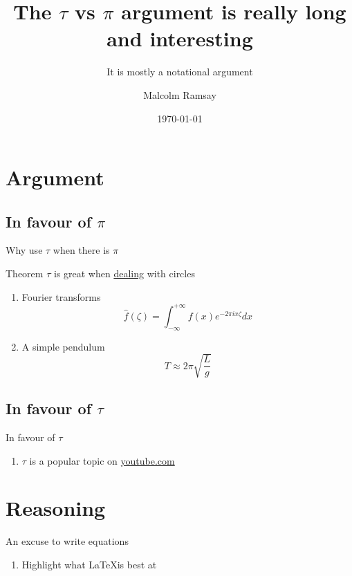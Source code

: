 \documentclass[aspectratio=169, 22pt]{beamer}
\title{The $\tau$ vs $\pi$ argument is really long and interesting}
\subtitle{It is mostly a notational argument}
\date{\today}
\author[Malcolm]{Malcolm Ramsay}
\begin{document}
\begin{frame}
  \titlepage{}
\end{frame}

\section{Argument}
\subsection{In favour of $\pi$}

\begin{frame}{Why use $\tau$ when there is $\pi$}
  \begin{block}{Theorem}
    $\tau$ is great when \href{http://blah}{dealing} with circles
  \end{block}

  \begin{enumerate}
    \item<1-> Fourier transforms
      \begin{equation}
        \hat f(\zeta) = \int_{-\infty}^{+\infty} f(x) e^{-2\pi ix\zeta} dx
      \end{equation}
    \item<2-> A simple pendulum
      \begin{equation}
        T \approx 2\pi \sqrt{\frac{L}{g}}
      \end{equation}
  \end{enumerate}
\end{frame}

\subsection{In favour of $\tau$}
\begin{frame}{In favour of $\tau$}
  \begin{enumerate}
    \item $\tau$ is a popular topic on \url{youtube.com}
  \end{enumerate}
\end{frame}

\section{Reasoning}

\begin{frame}{An excuse to write equations}
  \begin{enumerate}
    \item Highlight what \LaTeX is best at
  \end{enumerate}
\end{frame}
\end{document}

